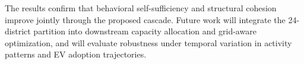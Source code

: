 \documentclass[conference]{IEEEtran}
\begin{document}
The results confirm that behavioral self-sufficiency and structural
cohesion improve jointly through the proposed cascade.
Future work will integrate the 24-district partition into downstream
capacity allocation and grid-aware optimization, and will evaluate
robustness under temporal variation in activity patterns and EV adoption
trajectories.
\cite{Annan2024}\cite{Katontoka2025}\cite{Zhang2025}\cite{Wang2023}%
\cite{Sun2024}\cite{Matkovic2024}\cite{Qin2026}\cite{Yuan2025}%
\cite{WANG_DENG_YAN_LI_2025}\cite{Zechao2024}\cite{BIAN2022}



\end{document}
